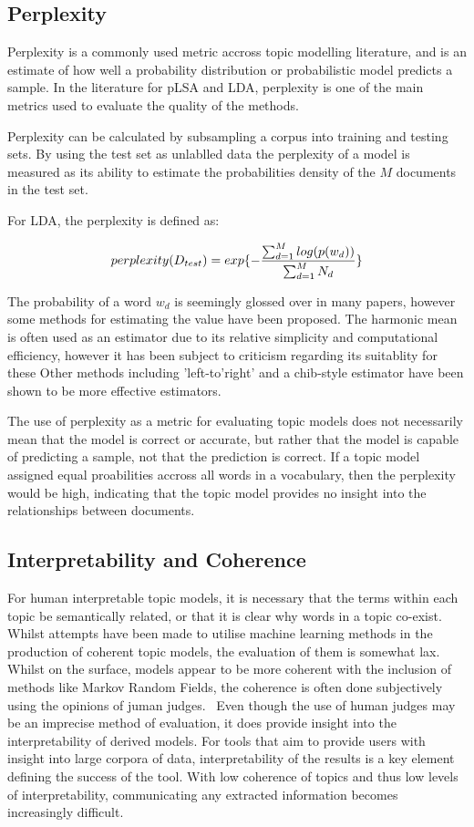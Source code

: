 \documentclass[10pt]{report}
\begin{document}
\subsection{Perplexity}
Perplexity is a commonly used metric accross topic modelling literature, and is an estimate of how well a probability distribution or probabilistic model predicts a sample. In the literature for pLSA and LDA, perplexity is one of the main metrics used to evaluate the quality of the methods.~\cite{Blei2003-dj,Hofmann1999-qb} 

Perplexity can be calculated by subsampling a corpus into training and testing sets. By using the test set as unlablled data the perplexity of a model is measured as its ability to estimate the probabilities density of the \(M\) documents in the test set.

\renewcommand{\baselinestretch}{1.0}\normalsize
For LDA, the perplexity is defined as:

\[
  perplexity(D_{test}) = exp\{-{{\sum^{M}_{d=1} log(p(w_d))}\over{\sum^{M}_{d=1} N_d}}\}
\]

\renewcommand{\baselinestretch}{2.0}\normalsize
The probability of a word \(w_d\) is seemingly glossed over in many papers, however some methods for estimating the value have been proposed. The harmonic mean is often used as an estimator due to its relative simplicity and computational efficiency, however it has been subject to criticism regarding its suitablity for these Other methods including 'left-to'right' and a chib-style estimator have been shown to be more effective estimators.~\cite{Newton1994-ws,Wallach2008-ti,Chib1995-wq,Wallach2009-ot}

The use of perplexity as a metric for evaluating topic models does not necessarily mean that the model is correct or accurate, but rather that the model is capable of predicting a sample, not that the prediction is correct. If a topic model assigned equal proabilities accross all words in a vocabulary, then the perplexity would be high, indicating that the topic model provides no insight into the relationships between documents.

\subsection{Interpretability and Coherence}
For human interpretable topic models, it is necessary that the terms within each topic be semantically related, or that it is clear why words in a topic co-exist. Whilst attempts have been made to utilise machine learning methods in the production of coherent topic models, the evaluation of them is somewhat lax. Whilst on the surface, models appear to be more coherent with the inclusion of methods like Markov Random Fields, the coherence is often done subjectively using the opinions of juman judges.~\cite{Xie2015-wv} Even though the use of human judges may be an imprecise method of evaluation, it does provide insight into the interpretability of derived models. For tools that aim to provide users with insight into large corpora of data, interpretability of the results is a key element defining the success of the tool. With low coherence of topics and thus low levels of interpretability, communicating any extracted information becomes increasingly difficult.
\end{document}
